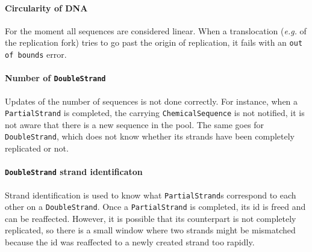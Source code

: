 \paragraph{Circularity of DNA} For the moment all sequences are considered linear. When a translocation (\textit{e.g.} of the replication fork) tries to go past the origin of replication, it fails with an \texttt{out of bounds} error.

\paragraph{Number of \texttt{DoubleStrand}} Updates of the number of sequences is not done correctly. For instance, when a \texttt{PartialStrand} is completed, the carrying \texttt{ChemicalSequence} is not notified, it is not aware that there is a new sequence in the pool. The same goes for \texttt{DoubleStrand}, which does not know whether its strands have been completely replicated or not.

\paragraph{\texttt{DoubleStrand} strand identificaton} Strand identification is used to know what \texttt{PartialStrand}s correspond to each other on a \texttt{DoubleStrand}. Once a \texttt{PartialStrand} is completed, its id is freed and can be reaffected. However, it is possible that its counterpart is not completely replicated, so there is a small window where two strands might be mismatched because the id was reaffected to a newly created strand too rapidly.

